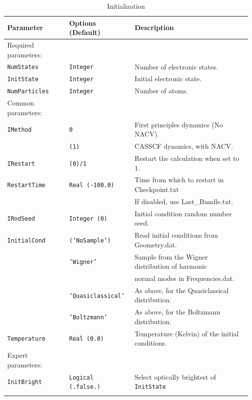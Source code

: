 \documentclass[11pt]{article}
\begin{document}
\begin{table}[h]
\caption{Initialization} \label{tab:aims}
\begin{tabular}{ l l l }
\hline\hline
Parameter & Options (Default) & Description \\
\hline
Required parameters:\\
{\tt NumStates}      &{\tt Integer}             & {\small Number of electronic states.}\\
{\tt InitState}      &{\tt Integer}             & {\small Initial electronic state.}\\
{\tt NumParticles}   &{\tt Integer}             & {\small Number of atoms.}\\
Common parameters:\\
{\tt IMethod}        &{\tt 0}                   & {\small First principles dynamics (No NACV).}\\
                     &{\tt (1)}                 & {\small CASSCF dynamics, with NACV.}\\
{\tt IRestart}       &{\tt (0)/1}               & {\small Restart the calculation when set to 1.}\\
{\tt RestartTime}    &{\tt Real (-100.0)}       & {\small Time from which to restart in Checkpoint.txt}\\&&
                                                  {\small If disabled, use Last\_Bundle.txt.}\\
{\tt IRndSeed}       &{\tt Integer (0)}         & {\small Initial condition random number seed.}\\
{\tt InitialCond}    &{\tt ('NoSample')}        & {\small Read initial conditions from Geometry.dat.}\\
                     &{\tt 'Wigner'}            & {\small Sample from the Wigner distribution of harmonic}\\&&
                                                  {\small normal modes in Frequencies.dat.}\\
                     &{\tt 'Quasiclassical'}    & {\small As above, for the Quasiclassical distribution.}\\
                     &{\tt 'Boltzmann'}         & {\small As above, for the Boltzmann distribution.}\\
{\tt Temperature}    &{\tt Real (0.0)}          & {\small Temperature (Kelvin) of the initial conditions.}\\
Expert parameters:\\
{\tt InitBright}     &{\tt Logical (.false.)}   & {\small Select optically brightest of {\tt InitState}}\\&&

\end{tabular}
\end{table}
\end{document}
